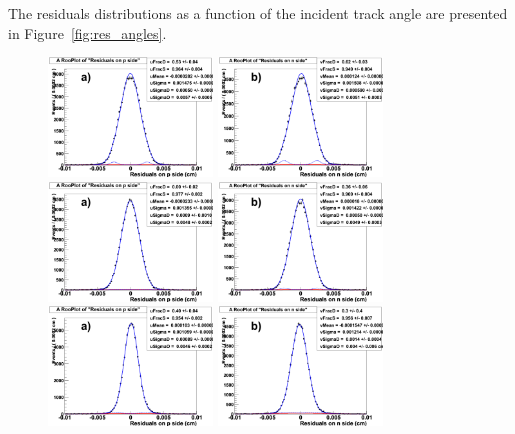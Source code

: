 The residuals distributions as a function of the incident track angle are presented in 
Figure~\ref{fig:res_angles}.

\begin{figure}[!htpb]
\centering
\includegraphics[width=0.39\textwidth]{res_pside_5deg.pdf}
\includegraphics[width=0.39\textwidth]{res_nside_5deg.pdf}
\includegraphics[width=0.39\textwidth]{res_pside_10deg.pdf}
\includegraphics[width=0.39\textwidth]{res_nside_10deg.pdf}
\includegraphics[width=0.39\textwidth]{res_pside_20deg.pdf}
\includegraphics[width=0.39\textwidth]{res_nside_20deg.pdf}

\end{figure}
